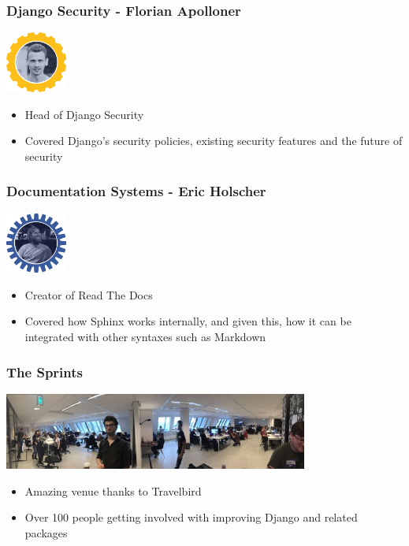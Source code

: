 \documentclass{beamer}
\begin{document}
\begin{frame}[fragile]\frametitle{Django Security - Florian Apolloner}

    \begin{center}
        \includegraphics[width=2cm]{speaker-florian}
    \end{center}

    \begin{itemize}
        \item Head of Django Security
        \item Covered Django's security policies, existing security features and the future of security
    \end{itemize}

\end{frame}


\begin{frame}[fragile]\frametitle{Documentation Systems - Eric Holscher}

    \begin{center}
        \includegraphics[width=2cm]{speaker-eric}
    \end{center}

    \begin{itemize}
        \item Creator of Read The Docs
        \item Covered how Sphinx works internally, and given this, how it can be integrated with other syntaxes such as Markdown
    \end{itemize}

\end{frame}


\begin{frame}[fragile]\frametitle{The Sprints}

    \begin{center}
        \includegraphics[width=10cm]{duth-sprints-panorama}
    \end{center}

    \begin{itemize}
        \item Amazing venue thanks to Travelbird
        \item Over 100 people getting involved with improving Django and related packages
    \end{itemize}

\end{frame}
\end{document}
